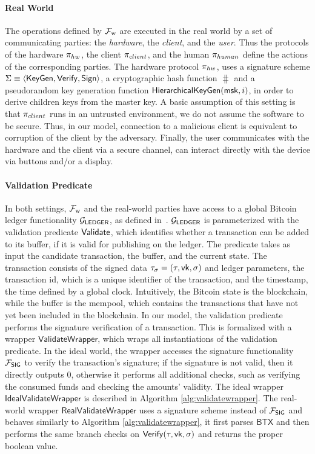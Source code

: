 \paragraph{Real World}
The operations defined by $\mathcal{F}_{\mathrm{w}}$ are executed in the real world by a set of
communicating parties: the \emph{hardware}, the \emph{client}, and the
\emph{user}. Thus the protocols of the hardware $\pi_{hw}$, the client $\pi_{client}$,
and the human $\pi_{human}$ define the actions of the corresponding parties. The
hardware protocol $\pi_{hw}$, uses a signature scheme $\Sigma \equiv \langle
\mathsf{KeyGen}, \mathsf{Verify}, \mathsf{Sign} \rangle$, a cryptographic hash function
$\hash$ and a pseudorandom key generation function
$\mathsf{HierarchicalKeyGen}(\mathsf{msk}, i)$, in order to derive children
keys from the master key. A basic assumption of this setting is that $\pi_{client}$
runs in an untrusted environment, \ie we do not assume the software to be
secure. Thus, in our model, connection to a malicious client is equivalent to
corruption of the client by the adversary. Finally, the user communicates with
the hardware and the client via a secure channel, \ie can interact directly
with the device via buttons and/or a display.

\paragraph{Validation Predicate}\label{sec:validation_predicate}
In both settings, $\mathcal{F}_{\mathrm{w}}$ and the real-world parties have access to a global
Bitcoin ledger functionality $\mathcal{G}_\mathsf{LEDGER}$, as defined in~\cite{C:BMTZ17}. $\mathcal{G}_\mathsf{LEDGER}$
is parameterized with the validation predicate $\mathsf{Validate}$, which
identifies whether a transaction can be added to its buffer, \ie if it is valid
for publishing on the ledger.  The predicate takes as input the candidate
transaction, the buffer, and the current state. The transaction consists of the
signed data $\tau_\sigma = (\tau, \mathsf{vk}, \sigma)$ and ledger parameters, \eg the
transaction id, which is a unique identifier of the transaction, and the
timestamp, \ie the time defined by a global clock. Intuitively, the Bitcoin
state is the blockchain, while the buffer is the mempool, which contains the
transactions that have not yet been included in the blockchain. In our model,
the validation predicate performs the signature verification of a transaction.
This is formalized with a wrapper $\mathsf{ValidateWrapper}$, which wraps all
instantiations of the validation predicate. In the ideal world, the wrapper
accesses the signature functionality $\mathcal{F}_\mathsf{SIG}$ to verify the transaction's
signature; if the signature is not valid, then it directly outputs $0$,
otherwise it performs all additional checks, such as verifying the consumed
funds and checking the amounts' validity.  The ideal wrapper
$\mathsf{IdealValidateWrapper}$ is described in Algorithm
\ref{alg:validatewrapper}. The real-world wrapper
$\mathsf{RealValidateWrapper}$ uses a signature scheme instead of $\mathcal{F}_\mathsf{SIG}$ and
behaves similarly to Algorithm \ref{alg:validatewrapper}, \ie it first parses
$\mathsf{BTX}$ and then performs the same branch checks on $\mathsf{Verify}(\tau,
\mathsf{vk}, \sigma)$ and returns the proper boolean value.


